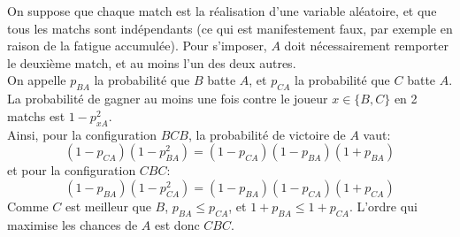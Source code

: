 On suppose que chaque match est la réalisation d'une variable aléatoire, et que tous les matchs sont indépendants (ce qui est manifestement faux, par exemple en raison de la fatigue accumulée). Pour s'imposer, $A$ doit nécessairement remporter le deuxième match, et au moins l'un des deux autres.\\
On appelle $p_{BA}$ la probabilité que $B$ batte $A$, et $p_{CA}$ la probabilité que $C$ batte $A$. La probabilité de gagner au moins une fois contre le joueur $x\in\{B,C\}$ en 2 matchs est $1-p^2_{xA}$.\\ Ainsi, pour la configuration $BCB$, la probabilité de victoire de $A$ vaut:
\[
(1-p_{CA})(1-p^2_{BA}) = (1-p_{CA})(1-p_{BA})(1+p_{BA})
\] 
et pour la configuration $CBC$:
\[(1-p_{BA})(1-p^2_{CA})=(1-p_{BA})(1-p_{CA})(1+p_{CA})\]
Comme $C$ est meilleur que $B$, $p_{BA} \leq p_{CA}$, et $1+p_{BA} \leq 1+p_{CA}$. L'ordre qui maximise les chances de $A$ est donc $CBC$.
